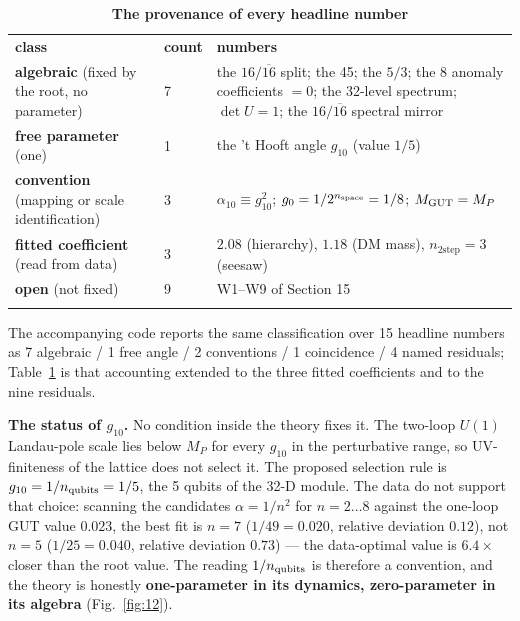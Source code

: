 \documentclass[aps,prd,twocolumn,amsmath,amssymb,superscriptaddress,nofootinbib,floatfix]{revtex4-2}
\newcommand{\grayhline}{\noalign{\vskip1pt{\color{black!30}\hrule height 0.3pt}\color{black}\vskip3pt}}
\begin{document}
\begin{table}[t]
\caption{\textbf{The provenance of every headline number}}
\label{tab:5}
\footnotesize
\begin{tabular}{@{}p{}p{}p{}@{}}
\toprule
\textbf{class} & \textbf{count} & \textbf{numbers} \\ \addlinespace[2pt] \midrule
\textbf{algebraic} (fixed by the root, no parameter) & 7 & the \(16/\overline{16}\) split; the 45; the \(5/3\); the 8 anomaly
coefficients \(=0\); the 32-level spectrum; \(\det U = 1\); the
\(16/\overline{16}\) spectral mirror \\ \addlinespace[2pt]
\grayhline
\textbf{free parameter} (one) & 1 & the 't Hooft angle \(g_{10}\) (value \(1/5\)) \\ \addlinespace[2pt]
\grayhline
\textbf{convention} (mapping or scale identification) & 3 & \(\alpha_{10} \equiv g_{10}^2\); \(g_0 = 1/2^{n_{\rm space}} = 1/8\);
\(M_{\rm GUT} = M_P\) \\ \addlinespace[2pt]
\grayhline
\textbf{fitted coefficient} (read from data) & 3 & \(2.08\) (hierarchy), \(1.18\) (DM mass), \(n_{2\text{step}} = 3\)
(seesaw) \\ \addlinespace[2pt]
\grayhline
\textbf{open} (not fixed) & 9 & W1--W9 of Section 15 \\ \addlinespace[2pt] \bottomrule
\end{tabular}
\end{table}

The accompanying code reports the same classification over 15 headline
numbers as 7 algebraic / 1 free angle / 2 conventions / 1 coincidence /
4 named residuals; Table~\ref{tab:5} is that accounting extended to the
three fitted coefficients and to the nine residuals.

\textbf{The status of \(g_{10}\).} No condition inside the theory fixes
it. The two-loop \(U(1)\) Landau-pole scale lies below \(M_P\) for every
\(g_{10}\) in the perturbative range, so UV-finiteness of the lattice
does not select it. The proposed selection rule is
\(g_{10} = 1/n_{\rm qubits} = 1/5\), the 5 qubits of the 32-D module.
The data do not support that choice: scanning the candidates
\(\alpha = 1/n^2\) for \(n = 2\dots8\) against the one-loop GUT value
\(0.023\), the best fit is \(n = 7\) (\(1/49 = 0.020\), relative
deviation \(0.12\)), not \(n = 5\) (\(1/25 = 0.040\), relative deviation
\(0.73\)) --- the data-optimal value is \(6.4\times\) closer than the
root value. The reading \(1/n_{\rm qubits}\) is therefore a convention,
and the theory is honestly \textbf{one-parameter in its dynamics,
zero-parameter in its algebra} (Fig.~\ref{fig:12}).
\end{document}
